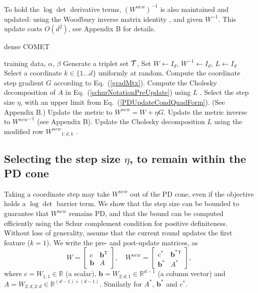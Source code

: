 \documentclass[twoside,11pt]{article}
\newcommand\mat[1]{{#1}}
\renewcommand\vec[1]{\mathbf{#1}}
\newcommand{\T}{{}^\mathsf{T}}
\newcommand{\W}{\mat{W}}
\newcommand{\newW}{{\mat{W^{new}}}}
\newcommand{\R}{\mathbb{R}}
\newcommand{\cholL}{\mat{L}}
\newcommand{\A}{\mat{A}}
\newcommand{\B}{\vec{b}}
\newcommand{\C}{c}
\newcommand{\Wvec}{\W_{2:d,1}}
\newcommand{\Wscalar}{\W_{1,1}}
\renewcommand{\eqref}[1]{Eq.~(\ref{#1})}
\begin{document}
To hold the $\log\det$ derivative terms, $(\newW)^{-1}$ is also maintained and updated: using the Woodbury inverse matrix identity \citep{woodbury1950inverting}, and given $\W^{-1}$. This update costs $O(d^2)$, see Appendix B for details.

\begin{algorithm}[th]
   \caption{dense COMET}
   \label{alg:comet}
\begin{algorithmic}[1]
    training data, $\alpha$, $\beta$
   \STATE Generate a triplet set $\cal{T}$, Set  $\W  \leftarrow I_d$, $\W^{-1}  \leftarrow I_d$, $\cholL  \leftarrow I_d$
   \REPEAT 
   \STATE Select a coordinate $k \in \{1 \ldots d\}$ uniformly at random.
   \STATE Compute the coordinate step gradient $\mat{G}$ according to \eqref{gradMtx}.
   \STATE Compute the Cholesky decomposition of $\A$ in \eqref{schurNotationPreUpdate} using $\cholL$ \citep{Davis05rowchol}.
   \STATE Select the step size $\eta$, with an upper limit from \eqref{PDUpdateCondQuadForm}. (See Appendix B.)
   \STATE Update the metric to $\newW=\W+\eta G$.
   \STATE Update the metric inverse to $\newW^{-1}$ (see Appendix B).
   \STATE Update the Cholesky decomposition $\cholL$ using the modified row $\newW_{1:d,k}$ \citep{Davis05rowchol}.
\end{algorithmic}
\end{algorithm}

\subsection{Selecting the step size $\eta$, to remain within the PD cone}\label{subsec:step}
Taking a coordinate step may take $\newW$ out of the PD cone, even if the objective holds a $\log\det$ barrier term. We show that the step size can be bounded to guarantee that $\newW$ remains PD, and that the bound can be computed efficiently using the Schur complement condition for positive definiteness. Without loss of generality, assume that the current round updates the first feature ($k = 1$). We write the pre- and post-update
matrices, as
\begin{equation}
  \W = \left[ \begin{matrix} \C & \B\T \\ \B & A \end{matrix} \right],
  \quad
  \newW = \left[ \begin{matrix} \C^* & \B^*\T \\ \B^* & A^* \end{matrix} \right],
  \label{schurNotationPreUpdate}
\end{equation}
 where $\C = \Wscalar \in \R$ (a scalar), $\B = \Wvec \in
\R^{d-1}$ (a column vector) and $A = \W_{2:d,2:d} \in \R^{(d-1)
\times (d-1)}$. Similarly for $A^*$, $\B^*$ and $\C^*$.
\end{document}
